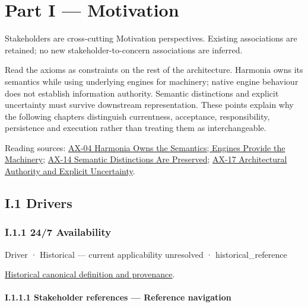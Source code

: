 \part*{Part I — Motivation}
\label{navigation:I}
Stakeholders are cross-cutting Motivation perspectives. Existing associations are retained; no new stakeholder-to-concern associations are inferred.\par
Read the axioms as constraints on the rest of the architecture. Harmonia owns its semantics while using underlying engines for machinery; native engine behaviour does not establish information authority. Semantic distinctions and explicit uncertainty must survive downstream representation. These points explain why the following chapters distinguish currentness, acceptance, responsibility, persistence and execution rather than treating them as interchangeable.

{\small Reading sources: \hyperref[element:54508cda80484a6caf95b901780eaf7d]{AX-04 Harmonia Owns the Semantics; Engines Provide the Machinery}; \hyperref[element:d3fc6025dc7646d1b2020b51f7a44bfa]{AX-14 Semantic Distinctions Are Preserved}; \hyperref[element:8882573df7ce43c6bc0f66da0a676139]{AX-17 Architectural Authority and Explicit Uncertainty}.}\par
\chapter*{I.1 Drivers}
\label{navigation:I.1}

\section*{I.1.1 24/7 Availability}
\label{navigation:I.1.1}

\label{element:782f53e2190f4a8a8d0dc0a33cd6fbb3}
{\small Driver · Historical — current applicability unresolved · historical\_reference}\par
\href{../../../../continuum/motivation/driver/782f53e2190f4a8a8d0dc0a33cd6fbb3.md}{Historical canonical definition and provenance}.\par
\subsection*{I.1.1.1 Stakeholder references — Reference navigation}
\label{navigation:I.1.1.1}

